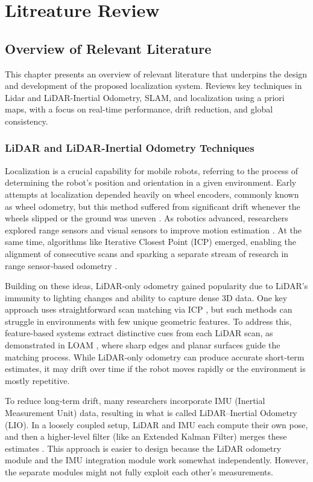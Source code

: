 \chapter{Litreature Review}
\label{ch:intro}
\section{Overview of Relevant Literature}
This chapter presents an overview of relevant literature that underpins the design and development of the proposed localization system. Reviews key techniques in Lidar and LiDAR-Inertial Odometry, SLAM, and localization using a priori maps, with a focus on real-time performance, drift reduction, and global consistency. 
\subsection{LiDAR and LiDAR-Inertial Odometry Techniques}
Localization is a crucial capability for mobile robots, referring to the process of determining the robot’s position and orientation in a given environment. Early attempts at localization depended heavily on wheel encoders, commonly known as wheel odometry, but this method suffered from significant drift whenever the wheels slipped or the ground was uneven \cite{MohamedOdometry}. As robotics advanced, researchers explored range sensors and visual sensors to improve motion estimation \cite{WangVisionSurvey}. At the same time, algorithms like Iterative Closest Point (ICP) emerged, enabling the alignment of consecutive scans and sparking a separate stream of research in range sensor‐based odometry \cite{BeslICP1992}.

Building on these ideas, LiDAR‐only odometry gained popularity due to LiDAR’s immunity to lighting changes and ability to capture dense 3D data. One key approach uses straightforward scan matching via ICP \cite{BeslICP1992}, but such methods can struggle in environments with few unique geometric features. To address this, feature-based systems extract distinctive cues from each LiDAR scan, as demonstrated in LOAM \cite{ZhangSinghLOAM2014}, where sharp edges and planar surfaces guide the matching process. While LiDAR‐only odometry can produce accurate short‐term estimates, it may drift over time if the robot moves rapidly or the environment is mostly repetitive.

To reduce long‐term drift, many researchers incorporate IMU (Inertial Measurement Unit) data, resulting in what is called LiDAR–Inertial Odometry (LIO). In a loosely coupled setup, LiDAR and IMU each compute their own pose, and then a higher‐level filter (like an Extended Kalman Filter) merges these estimates \cite{TangLooselyCoupled}. This approach is easier to design because the LiDAR odometry module and the IMU integration module work somewhat independently. However, the separate modules might not fully exploit each other’s measurements.

